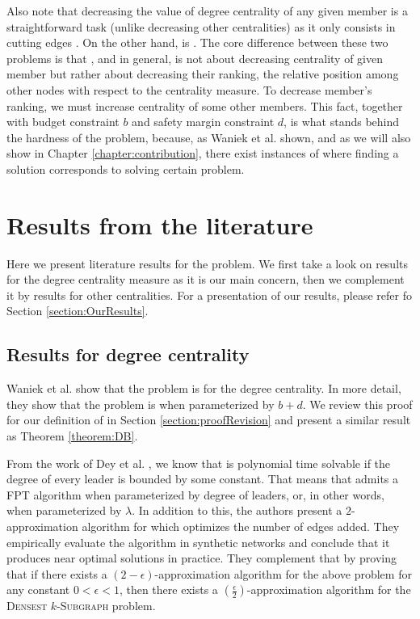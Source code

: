 Also note that decreasing the value of degree centrality of any given member is a straightforward task
(unlike decreasing other centralities) as it only consists in cutting edges \cite{Waniek2016}.
On the other hand, \HLdeg is \NPc \cite{Waniek2017}.
The core difference between these two problems is that \HLdeg, and \HLshort in general,
is not about decreasing centrality of given member but rather about decreasing their ranking,
the relative position among other nodes with respect to the centrality measure.
To decrease member's ranking, we must increase centrality of some other members.
This fact, together with budget constraint $b$ and safety margin constraint $d$,
is what stands behind the hardness of the \HL problem, because,
as Waniek et al. \cite{Waniek2017} shown, and as we will also show in Chapter \ref{chapter:contribution},
there exist instances of \HLshort where finding a solution corresponds to solving certain \NPh problem.


\section{Results from the literature}

Here we present literature results for the \HL problem.
We first take a look on results for the degree centrality measure as it is our main concern, then we
complement it by results for other centralities.
For a presentation of our results, please refer fo Section \ref{section:OurResults}.


\subsection{Results for degree centrality}\label{subsection:ResultsDegree}

Waniek et al. \cite{Waniek2017} show that the \HL problem is \NPc for the degree centrality.
In more detail, they show that the problem is \Wh when parameterized by $b+d$.
We review this proof for our definition of \HLshort in Section \ref{section:proofRevision} and present
a similar result as Theorem \ref{theorem:DB}.

From the work of Dey et al. \cite{Dey2019}, we know that \HLdeg is polynomial time solvable
if the degree of every leader is bounded by some constant.
That means that \HLdeg admits a FPT algorithm when parameterized by degree of leaders, or,
in other words, when parameterized by $\lambda$.
In addition to this, the authors present a $2$-approximation algorithm for \HLdeg which optimizes
the number of edges added.
They empirically evaluate the algorithm in synthetic networks and conclude that it produces near
optimal solutions in practice.
They complement that by proving that if there exists a $(2-\epsilon)$-approximation algorithm
for the above problem for any constant $0 < \epsilon < 1$, then there exists
a $(\frac{\epsilon}{2})$-approximation algorithm for the \textsc{Densest} $k$-\textsc{Subgraph} problem.


